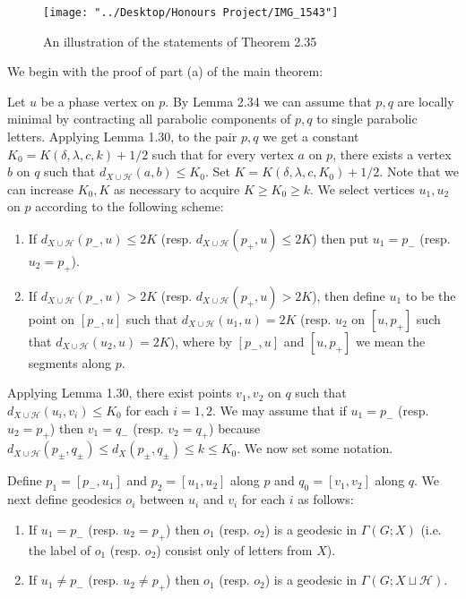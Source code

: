 \documentclass[12pt]{article}
\newcommand{\vs}{\vskip10pt}
\begin{document}
\begin{figure} [H]
	\centering
	\texttt{[image: "../Desktop/Honours Project/IMG\_1543"]}
	\caption{An illustration of the statements of Theorem 2.35}
	\label{fig:img1543}
\end{figure}

	We begin with the proof of part (a) of the main theorem: 
	
	\vs
	
	Let $u$ be a phase vertex on $p$. By Lemma 2.34 we can assume that $p,q$ are locally minimal by contracting all parabolic components of $p,q$ to single parabolic letters. Applying Lemma 1.30, to the pair $p,q$ we get a constant $K_0 = K(\delta, \lambda, c, k) + 1/2$ such that for every vertex $a$ on $p$, there exists a vertex $b$ on $q$ such that $d_{X \cup \mathcal{H}}(a,b) \leq K_0$. Set $K = K(\delta, \lambda, c, K_0) + 1/2$. Note that we can increase $K_0, K$ as necessary to acquire $K \geq K_0 \geq k$. We select vertices $u_1, u_2$ on $p$ according to the following scheme: 
	
	\begin{enumerate}[label = (\roman*)]
		\item If $d_{X \cup \mathcal{H}}(p_-, u) \leq 2K$ (resp. $d_{X \cup \mathcal{H}}(p_+, u) \leq 2K$) then put $u_1 = p_-$ (resp. $u_2 = p_+$). 
		\item If $d_{X \cup \mathcal{H}}(p_-, u) > 2K$ (resp. $d_{X \cup \mathcal{H}}(p_+, u)> 2K$), then define $u_1$ to be the point on $[p_-, u]$ such that $d_{X \cup \mathcal{H}}(u_1, u) = 2K$ (resp. $u_2$ on $[u, p_+]$ such that $d_{X \cup \mathcal{H}}(u_2, u) = 2K$), where by $[p_-, u]$ and $[u, p_+]$ we mean the segments along $p$. 
	\end{enumerate}

	Applying Lemma 1.30, there exist points $v_1, v_2$ on $q$ such that $d_{X \cup \mathcal{H}}(u_i, v_i) \leq K_0$ for each $i = 1,2$. We may assume that if $u_1 = p_-$ (resp. $u_2 = p_+$) then $v_1 = q_-$ (resp. $v_2 = q_+$) because $d_{X \cup \mathcal{H}}(p_{\pm}, q_{\pm}) \leq d_X(p_{\pm}, q_{\pm}) \leq k \leq K_0$. We now set some notation.
	
	\vs 
	
	Define $p_1 = [p_-, u_1]$ and $p_2 = [u_1, u_2]$ along $p$ and $q_0 = [v_1, v_2]$ along $q$. We next define geodesics $o_i$ between $u_i$ and $v_i$ for each $i$ as follows: 
	
	\begin{enumerate} [label = (\roman*)]
		\item If $u_1 = p_-$ (resp. $u_2 = p_+$) then $o_1$ (resp. $o_2$) is a geodesic in $\Gamma(G; X)$ (i.e. the label of $o_1$ (resp. $o_2$) consist only of letters from $X$).
		\item If $u_1 \neq p_-$ (resp. $u_2 \neq p_+$) then $o_1$ (resp. $o_2$) is a geodesic in $\Gamma(G; X \sqcup \mathcal{H})$. 
	\end{enumerate}
\end{document}
